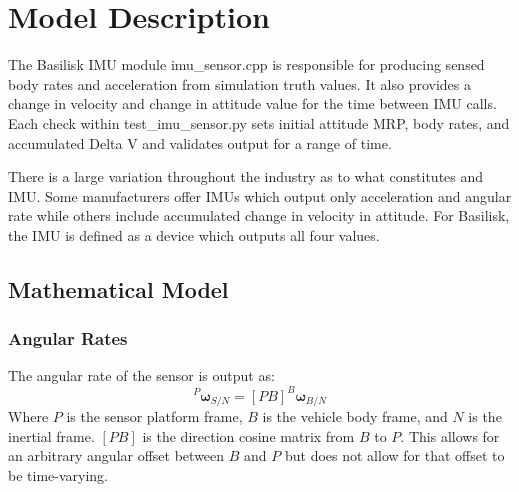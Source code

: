 \section{Model Description}
The Basilisk IMU module imu\_sensor.cpp is responsible for producing sensed body rates and acceleration from simulation truth values. It also provides a change in velocity and change in attitude value for the time between IMU calls. Each check within test\_imu\_sensor.py sets initial attitude MRP, body rates, and accumulated Delta V and validates output for a range of time.

There is a large variation throughout the industry as to what constitutes and IMU.  Some manufacturers offer IMUs which output only acceleration and angular rate while others include accumulated change in velocity in attitude. For Basilisk, the IMU is defined as a device which outputs all four values.

\subsection{Mathematical Model}

\subsubsection{Angular Rates}
The angular rate of the sensor is output as:
\begin{equation}
	^P\bm{\omega}_{S/N} = [PB] ^B\bm{\omega}_{B/N}
\end{equation}
Where $P$ is the sensor platform frame, $B$ is the vehicle body frame, and $N$ is the inertial frame. $[PB]$ is the direction cosine matrix from $B$ to $P$. This allows for an arbitrary angular offset between $B$ and $P$ but does not allow for that offset to be time-varying.


